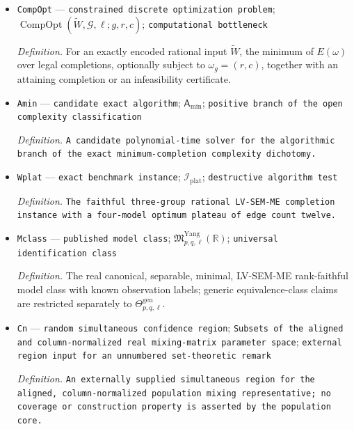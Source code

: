 \documentclass{article}
\begin{document}
\begin{itemize}
  \par\smallskip\noindent\emph{Definition.} \texttt{The complete minimum-\allowbreak{}DOG image of the labeled pairwise total effect for the displayed real mixing representative,\allowbreak{} recovered group system,\allowbreak{} and known observation labels.}
  \item \texttt{CompOpt} --- \texttt{constrained discrete optimization problem}; \(\operatorname{CompOpt}(\widetilde W,\mathcal G,\ell;g,r,c)\); \texttt{computational bottleneck}
  \par\smallskip\noindent\emph{Definition.} For an exactly encoded rational input \(\widetilde W\), the minimum of \(E(\omega)\) over legal completions, optionally subject to \(\omega_g=(r,c)\), together with an attaining completion or an infeasibility certificate.
  \item \texttt{Amin} --- \texttt{candidate exact algorithm}; \(\mathsf A_{\min}\); \texttt{positive branch of the open complexity classification}
  \par\smallskip\noindent\emph{Definition.} \texttt{A candidate polynomial-\allowbreak{}time solver for the algorithmic branch of the exact minimum-\allowbreak{}completion complexity dichotomy.}
  \item \texttt{Wplat} --- \texttt{exact benchmark instance}; \(\mathcal I_{\mathrm{plat}}\); \texttt{destructive algorithm test}
  \par\smallskip\noindent\emph{Definition.} \texttt{The faithful three-\allowbreak{}group rational LV-\allowbreak{}SEM-\allowbreak{}ME completion instance with a four-\allowbreak{}model optimum plateau of edge count twelve.}
  \item \texttt{Mclass} --- \texttt{published model class}; \(\mathfrak M_{p,q,\ell}^{\mathrm{Yang}}(\mathbb R)\); \texttt{universal identification class}
  \par\smallskip\noindent\emph{Definition.} The real canonical, separable, minimal, LV-SEM-ME rank-faithful model class with known observation labels; generic equivalence-class claims are restricted separately to \(\Theta_{p,q,\ell}^{\mathrm{gen}}\).
  \item \texttt{Cn} --- \texttt{random simultaneous confidence region}; \texttt{Subsets of the aligned and column-\allowbreak{}normalized real mixing-\allowbreak{}matrix parameter space}; \texttt{external region input for an unnumbered set-\allowbreak{}theoretic remark}
  \par\smallskip\noindent\emph{Definition.} \texttt{An externally supplied simultaneous region for the aligned,\allowbreak{} column-\allowbreak{}normalized population mixing representative;\allowbreak{} no coverage or construction property is asserted by the population core.}

\end{itemize}
\end{document}
